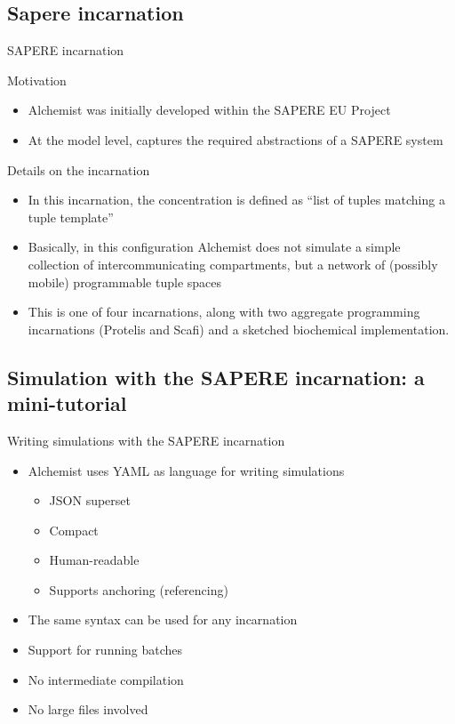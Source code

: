 \documentclass[presentation]{beamer}
\begin{document}
\subsection{Sapere incarnation}
\begin{frame}{SAPERE incarnation}
 \begin{block}{Motivation}
  \begin{itemize}
   \item Alchemist was initially developed within the SAPERE EU Project
   \item At the model level, captures the required abstractions of a SAPERE system
  \end{itemize}
 \end{block}
 \begin{block}{Details on the incarnation}
  \begin{itemize}
   \item In this incarnation, the concentration is defined as ``list of tuples matching a tuple template''
   \item Basically, in this configuration Alchemist does not simulate a simple collection of intercommunicating compartments, but a network of (possibly mobile) programmable tuple spaces
   \item This is one of four incarnations, along with two aggregate programming incarnations (Protelis and Scafi) and a sketched biochemical implementation.
  \end{itemize}
 \end{block}
\end{frame}

\subsection{Simulation with the SAPERE incarnation: a mini-tutorial}

\begin{frame}{Writing simulations with the SAPERE incarnation}
	\begin{itemize}
		\item Alchemist uses YAML as language for writing simulations
		\begin{itemize}
			\item JSON superset
			\item Compact
			\item Human-readable
			\item Supports anchoring (referencing)
		\end{itemize}
		\item The same syntax can be used for any incarnation
		\item Support for running batches
		\item No intermediate compilation
		\item No large files involved
	\end{itemize}
\end{frame}
\end{document}
